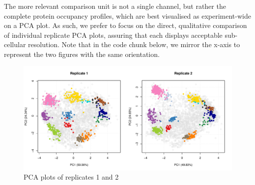 



The more relevant comparison unit is not a single channel, but rather
the complete protein occupancy profiles, which are best visualised as
experiment-wide on a PCA plot. As such, we prefer to focus on the
direct, qualitative comparison of individual replicate PCA plots,
assuring that each displays acceptable sub-cellular resolution. Note
that in the code chunk below, we mirror the x-axis to represent the
two figures with the same orientation.


\begin{figure}[!ht]
  \centering
\begin{knitrout}
\color{fgcolor}\begin{kframe}
\begin{alltt}
\hlstd{(} \hlstd{=} \hlstd{(}\hlstd{,} \hlstd{))}
\hlstd{(hl[, hl}\hlopt{$} \hlopt{==} \hlstd{],}  \hlstd{=} \hlstd{)}
\hlstd{(hl[, hl}\hlopt{$} \hlopt{==} \hlstd{],}  \hlstd{=} \hlstd{,}  \hlstd{=} \hlstd{)}
\end{alltt}
\end{kframe}
\includegraphics[width=\textwidth]{figure/plot2Drep-1} 

\end{knitrout}
  \caption{PCA plots of replicates 1 and 2}
  \label{fig:plot2Drep}
\end{figure}



